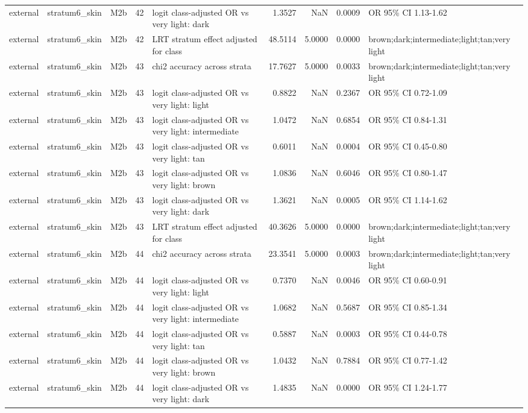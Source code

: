 \begin{tabular}{lllrlrrrl}
external & stratum6\_skin & M2b & 42 & logit class-adjusted OR vs very light: dark & 1.3527 & NaN & 0.0009 & OR 95\% CI 1.13-1.62 \\
external & stratum6\_skin & M2b & 42 & LRT stratum effect adjusted for class & 48.5114 & 5.0000 & 0.0000 & brown;dark;intermediate;light;tan;very light \\
external & stratum6\_skin & M2b & 43 & chi2 accuracy across strata & 17.7627 & 5.0000 & 0.0033 & brown;dark;intermediate;light;tan;very light \\
external & stratum6\_skin & M2b & 43 & logit class-adjusted OR vs very light: light & 0.8822 & NaN & 0.2367 & OR 95\% CI 0.72-1.09 \\
external & stratum6\_skin & M2b & 43 & logit class-adjusted OR vs very light: intermediate & 1.0472 & NaN & 0.6854 & OR 95\% CI 0.84-1.31 \\
external & stratum6\_skin & M2b & 43 & logit class-adjusted OR vs very light: tan & 0.6011 & NaN & 0.0004 & OR 95\% CI 0.45-0.80 \\
external & stratum6\_skin & M2b & 43 & logit class-adjusted OR vs very light: brown & 1.0836 & NaN & 0.6046 & OR 95\% CI 0.80-1.47 \\
external & stratum6\_skin & M2b & 43 & logit class-adjusted OR vs very light: dark & 1.3621 & NaN & 0.0005 & OR 95\% CI 1.14-1.62 \\
external & stratum6\_skin & M2b & 43 & LRT stratum effect adjusted for class & 40.3626 & 5.0000 & 0.0000 & brown;dark;intermediate;light;tan;very light \\
external & stratum6\_skin & M2b & 44 & chi2 accuracy across strata & 23.3541 & 5.0000 & 0.0003 & brown;dark;intermediate;light;tan;very light \\
external & stratum6\_skin & M2b & 44 & logit class-adjusted OR vs very light: light & 0.7370 & NaN & 0.0046 & OR 95\% CI 0.60-0.91 \\
external & stratum6\_skin & M2b & 44 & logit class-adjusted OR vs very light: intermediate & 1.0682 & NaN & 0.5687 & OR 95\% CI 0.85-1.34 \\
external & stratum6\_skin & M2b & 44 & logit class-adjusted OR vs very light: tan & 0.5887 & NaN & 0.0003 & OR 95\% CI 0.44-0.78 \\
external & stratum6\_skin & M2b & 44 & logit class-adjusted OR vs very light: brown & 1.0432 & NaN & 0.7884 & OR 95\% CI 0.77-1.42 \\
external & stratum6\_skin & M2b & 44 & logit class-adjusted OR vs very light: dark & 1.4835 & NaN & 0.0000 & OR 95\% CI 1.24-1.77 \\

\end{tabular}
